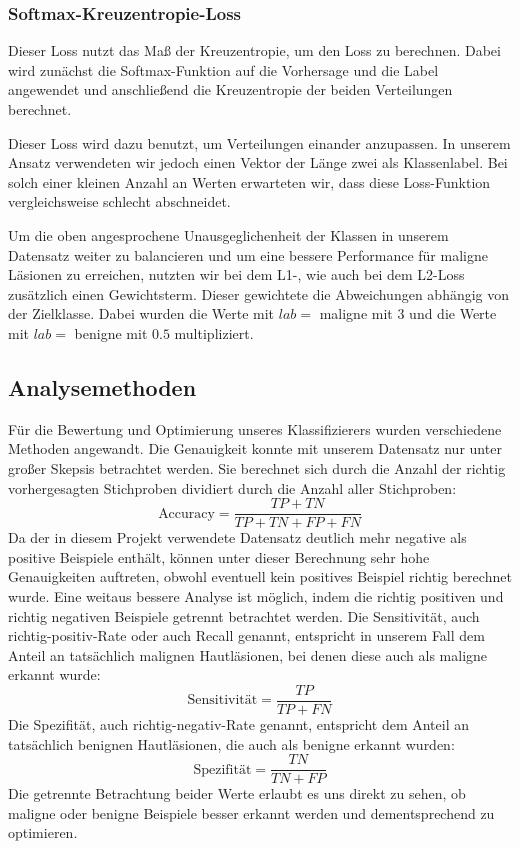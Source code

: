 \subsubsection{Softmax-Kreuzentropie-Loss}
	Dieser Loss nutzt das Maß der Kreuzentropie, um den Loss zu berechnen. Dabei wird zunächst die Softmax-Funktion auf die Vorhersage und die Label angewendet und anschließend die Kreuzentropie der beiden Verteilungen berechnet.
	
	Dieser Loss wird dazu benutzt, um Verteilungen einander anzupassen. In unserem Ansatz verwendeten wir jedoch einen Vektor der Länge zwei als Klassenlabel. Bei solch einer kleinen Anzahl an Werten erwarteten wir, dass diese Loss-Funktion vergleichsweise schlecht abschneidet.
		
Um die oben angesprochene Unausgeglichenheit der Klassen in unserem Datensatz weiter zu balancieren und um eine bessere Performance für maligne Läsionen zu erreichen, nutzten wir bei dem L1-, wie auch bei dem L2-Loss zusätzlich einen Gewichtsterm. Dieser gewichtete die Abweichungen abhängig von der Zielklasse. Dabei wurden die Werte mit $lab=$ maligne mit $3$ und die Werte mit $lab=$ benigne mit $0.5$ multipliziert. 
	  

\subsection{Analysemethoden}
\label{analysemethoden}

Für die Bewertung und Optimierung unseres Klassifizierers wurden verschiedene Methoden angewandt. Die Genauigkeit konnte mit unserem Datensatz nur unter großer Skepsis betrachtet werden. Sie berechnet sich durch die Anzahl der richtig vorhergesagten Stichproben dividiert durch die Anzahl aller Stichproben:
	\[\text{Accuracy} = \frac{TP+TN}{TP+TN+FP+FN}\]
Da der in diesem Projekt verwendete Datensatz deutlich mehr negative als positive Beispiele enthält, können unter dieser Berechnung sehr hohe Genauigkeiten auftreten, obwohl eventuell kein positives Beispiel richtig berechnet wurde.
Eine weitaus bessere Analyse ist möglich, indem die richtig positiven und richtig negativen Beispiele getrennt betrachtet werden. Die Sensitivität, auch richtig-positiv-Rate oder auch Recall genannt, entspricht in unserem Fall dem Anteil an tatsächlich malignen Hautläsionen, bei denen diese auch als maligne erkannt wurde:
\[\text{Sensitivität} = \frac{TP}{TP+FN}\]
Die Spezifität, auch richtig-negativ-Rate genannt, entspricht dem Anteil an tatsächlich benignen Hautläsionen, die auch als benigne erkannt wurden:
\[\text{Spezifität} = \frac{TN}{TN+FP}\]
Die getrennte Betrachtung beider Werte erlaubt es uns direkt zu sehen, ob maligne oder benigne Beispiele besser erkannt werden und dementsprechend zu optimieren.

